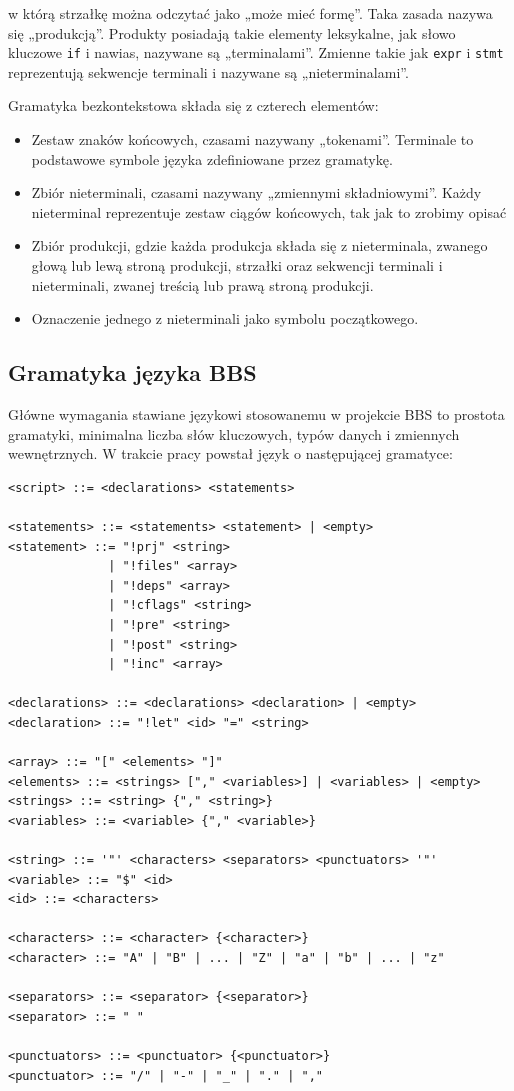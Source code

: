 w którą strzałkę można odczytać jako „może mieć formę”. Taka zasada nazywa się „produkcją”. Produkty posiadają takie elementy leksykalne, jak słowo kluczowe \texttt{if} i nawias, nazywane są „terminalami”. Zmienne takie jak \texttt{expr} i \texttt{stmt} reprezentują sekwencje terminali i nazywane są „nieterminalami”.

Gramatyka bezkontekstowa składa się z czterech elementów:
\begin{itemize}
    \item Zestaw znaków końcowych, czasami nazywany „tokenami”. Terminale to podstawowe symbole języka zdefiniowane przez gramatykę.
    \item Zbiór nieterminali, czasami nazywany „zmiennymi składniowymi”. Każdy nieterminal reprezentuje zestaw ciągów końcowych, tak jak to zrobimy opisać
    \item Zbiór produkcji, gdzie każda produkcja składa się z nieterminala, zwanego głową lub lewą stroną produkcji, strzałki oraz sekwencji terminali i nieterminali, zwanej treścią lub prawą stroną produkcji.
    \item Oznaczenie jednego z nieterminali jako symbolu początkowego.
\end{itemize}

\subsection{Gramatyka języka BBS}

Główne wymagania stawiane językowi stosowanemu w projekcie BBS to prostota gramatyki, minimalna liczba słów kluczowych, typów danych i zmiennych wewnętrznych. W trakcie pracy powstał język o następującej gramatyce:

\begin{lstlisting}[label=list:grammar,caption=Gramatyka języka projektu BBS,basicstyle=\footnotesize\ttfamily]
<script> ::= <declarations> <statements>

<statements> ::= <statements> <statement> | <empty>
<statement> ::= "!prj" <string>
              | "!files" <array>
              | "!deps" <array>
              | "!cflags" <string>
              | "!pre" <string>
              | "!post" <string>
              | "!inc" <array>

<declarations> ::= <declarations> <declaration> | <empty>
<declaration> ::= "!let" <id> "=" <string>

<array> ::= "[" <elements> "]"
<elements> ::= <strings> ["," <variables>] | <variables> | <empty>
<strings> ::= <string> {"," <string>}
<variables> ::= <variable> {"," <variable>}

<string> ::= '"' <characters> <separators> <punctuators> '"'
<variable> ::= "$" <id>
<id> ::= <characters>

<characters> ::= <character> {<character>}
<character> ::= "A" | "B" | ... | "Z" | "a" | "b" | ... | "z"

<separators> ::= <separator> {<separator>}
<separator> ::= " "

<punctuators> ::= <punctuator> {<punctuator>}
<punctuator> ::= "/" | "-" | "_" | "." | ","
\end{lstlisting}

